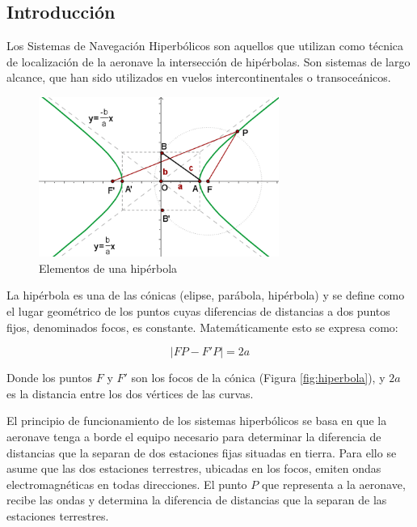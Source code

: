 %

\subsection{Introducci\'on}

Los Sistemas de Navegaci\'on Hiperb\'olicos son aquellos que utilizan como t\'ecnica de localizaci\'on de la aeronave la intersecci\'on de hip\'erbolas. Son sistemas de largo alcance, que han sido utilizados en vuelos intercontinentales o transoce\'anicos.

\begin{figure}[!h]
  \centering
\includegraphics[width=0.7\textwidth]{06.radionavegacion/Imagenes/06.01.adf/Hiperbola.gif}
  \caption{Elementos de una hip\'erbola}
  \label{fig:hiperbola}
  \label{!h}
\end{figure}


La hip\'erbola es una de las c\'onicas (elipse, par\'abola, hip\'erbola) y se define como el lugar geom\'etrico de los puntos cuyas diferencias de distancias a dos puntos fijos, denominados focos, es constante. Matem\'aticamente esto se expresa como:

\[\left|{FP}-{F'P}\right|= 2a
\]

Donde los puntos $F$ y $F'$ son los focos de la c\'onica (Figura \ref{fig:hiperbola}), y $2a$ es la distancia entre los dos v\'ertices de las curvas.

El principio de funcionamiento de los sistemas hiperb\'olicos se basa en que la aeronave tenga a borde el equipo necesario para determinar la diferencia de distancias que la separan de dos estaciones fijas situadas en tierra. Para ello se asume que las dos estaciones terrestres, ubicadas en los focos, emiten ondas electromagn\'eticas en todas direcciones. El punto $P$ que representa a la aeronave, recibe las ondas y determina la diferencia de distancias que la separan de las estaciones terrestres.

